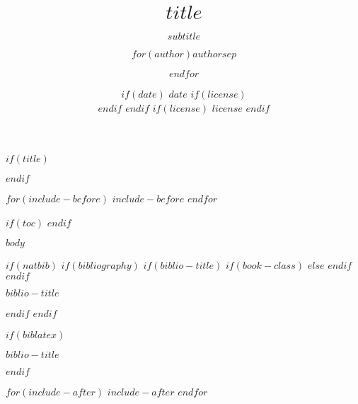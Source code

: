 \documentclass[$if(fontsize)$$fontsize$,$else$14pt,$endif$$if(lang)$$babel-lang$,$endif$$if(handout)$handout,$endif$$if(colorlinks)$dvipsnames,$endif$$if(beamer)$ignorenonframetext,$endif$$for(classoption)$$classoption$$sep$,$endfor$]{$documentclass$}
\title[$shorttitle$]{$title$}
\subtitle{$subtitle$}
\author[
    $if(short-author)$
    $for(short-author)$$short-author$$sep$ \and $endfor$
  $else$
    $for(author)$$author$$sep$ \and $endfor$
  $endif$
  ]{$for(author)$$author$$sep$ \and $endfor$}
\institute[
  $if(short-institute)$
    $for(short-institute)$$short-institute$$sep$ \and $endfor$
  $endif$
  ]{
  $if(department)$
    $for(department)$$department$$sep$ \and $endfor$ \\
  $endif$
  $for(institute)$$institute$$sep$ \and $endfor$
  $if(email)$
    \\ $for(email)$ \href{mailto:$email$}{\nolinkurl{$email$}}$sep$ \and $endfor$
  $endif$
  }
\date[
  $if(short-date)$
    $short-date$
  $else$
    $date$
  $endif$]{
  $if(date)$
    $date$
    $if(license)$
      \\ \vspace{5mm}
    $endif$
  $endif$
  $if(license)$
    {\scriptsize $license$}
  $endif$
}
\newif\ifbibliography
\begin{document}
$if(title)$
  \begin{frame}[plain]
  \titlepage
  \end{frame}
$endif$

$for(include-before)$
  $include-before$
$endfor$

$if(toc)$
$endif$

$body$

$if(natbib)$
  $if(bibliography)$
    $if(biblio-title)$
      $if(book-class)$
        \renewcommand\bibname{$biblio-title$}
        $else$
        \renewcommand\refname{$biblio-title$}
      $endif$
    $endif$
    \begin{frame}[allowframebreaks]{$biblio-title$}
    \bibliographytrue
    
    \end{frame}
  $endif$
$endif$

$if(biblatex)$
  \begin{frame}[allowframebreaks]{$biblio-title$}
  \bibliographytrue
  \printbibliography[heading=none]
  \end{frame}
$endif$

$for(include-after)$
  $include-after$
$endfor$
\end{document}

